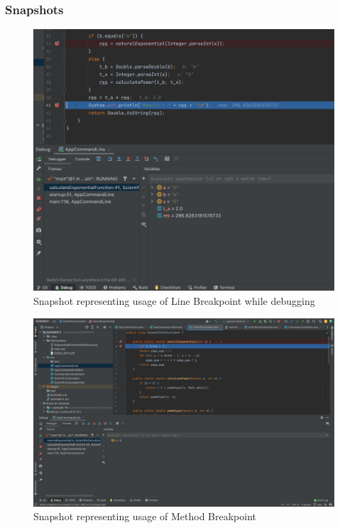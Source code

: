 \documentclass[a4paper,12pt]{report}
\begin{document}
\subsubsection{Snapshots}

\begin{figure}
\includegraphics[width=15cm]{LineBreakpoint.png}
\caption{Snapshot representing usage of Line Breakpoint while debugging}
\label{exp}
\end{figure}

\begin{figure}
\includegraphics[width=15cm]{MethodBreakpoint.png}
\caption{Snapshot representing usage of Method Breakpoint}
\label{exp}
\end{figure}
\end{document}
